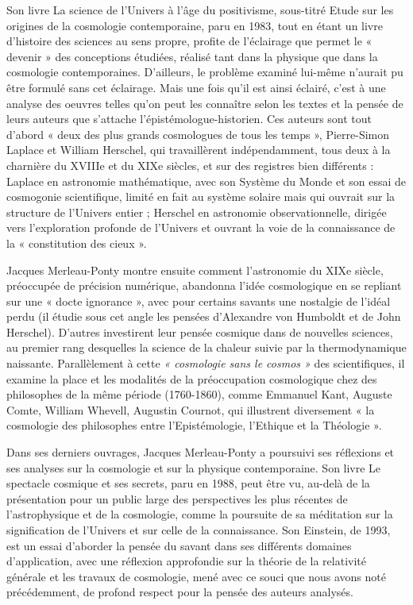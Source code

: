 \documentclass[a4paper,12pt]{article}
\begin{document}
Son livre La science de l'Univers à l'âge du positivisme, sous-titré
Etude sur les origines de la cosmologie contemporaine, paru en 1983, tout en étant
un livre d'histoire des sciences au sens propre, profite de l'éclairage que permet le
« devenir » des conceptions étudiées, réalisé tant dans la physique que dans la
cosmologie contemporaines. D'ailleurs, le problème examiné lui-même n'aurait pu
être formulé sans cet éclairage. Mais une fois qu'il est ainsi éclairé, c'est à une
analyse des oeuvres telles qu'on peut les connaître selon les textes et la pensée de
leurs auteurs que s'attache l'épistémologue-historien. Ces auteurs sont tout d'abord
« deux des plus grands cosmologues de tous les temps », Pierre-Simon Laplace et
William Herschel, qui travaillèrent indépendamment, tous deux à la charnière du
XVIIIe et du XIXe siècles, et sur des registres bien différents : Laplace en astronomie
mathématique, avec son Système du Monde et son essai de cosmogonie
scientifique, limité en fait au système solaire mais qui ouvrait sur la structure de
l'Univers entier ; Herschel en astronomie observationnelle, dirigée vers
l'exploration profonde de l'Univers et ouvrant la voie de la connaissance de la
« constitution des cieux ».


Jacques Merleau-Ponty montre ensuite comment l'astronomie du XIXe
siècle, préoccupée de précision numérique, abandonna l'idée cosmologique en se
repliant sur une « docte ignorance », avec pour certains savants une nostalgie de
l'idéal perdu (il étudie sous cet angle les pensées d'Alexandre von Humboldt et de
John Herschel). D'autres investirent leur pensée cosmique dans de nouvelles
sciences, au premier rang desquelles la science de la chaleur suivie par la
thermodynamique naissante. Parallèlement à cette \textit{« cosmologie sans le cosmos »}
des scientifiques, il examine la place et les modalités de la préoccupation
cosmologique chez des philosophes de la même période (1760-1860), comme
Emmanuel Kant, Auguste Comte, William Whevell, Augustin Cournot, qui
illustrent diversement « la cosmologie des philosophes entre l'Epistémologie,
l'Ethique et la Théologie ».



Dans ses derniers ouvrages, Jacques Merleau-Ponty a poursuivi ses
réflexions et ses analyses sur la cosmologie et sur la physique contemporaine. Son
livre Le spectacle cosmique et ses secrets, paru en 1988, peut être vu, au-delà de la
présentation pour un public large des perspectives les plus récentes de
l’astrophysique et de la cosmologie, comme la poursuite de sa méditation sur la
signification de l'Univers et sur celle de la connaissance. Son Einstein, de 1993, est
un essai d'aborder la pensée du savant dans ses différents domaines d'application,
avec une réflexion approfondie sur la théorie de la relativité générale et les travaux
de cosmologie, mené avec ce souci que nous avons noté précédemment, de profond
respect pour la pensée des auteurs analysés.
\end{document}
